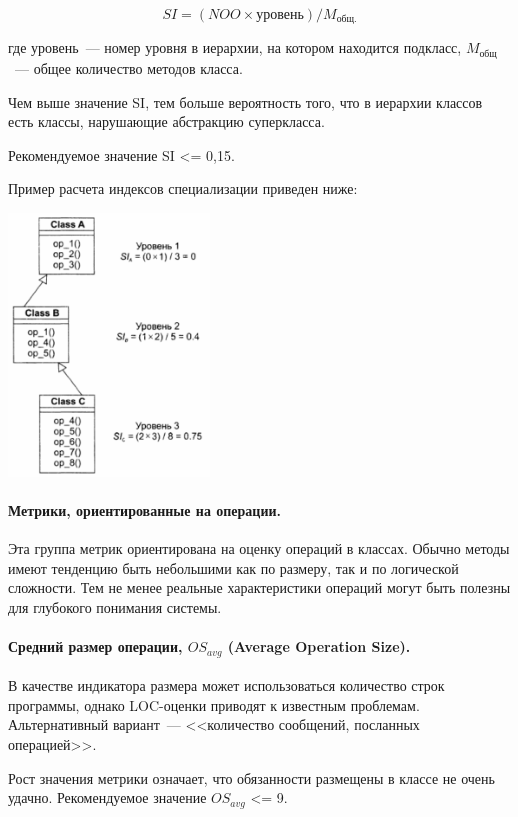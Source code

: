 \documentclass{../../text-style}
\begin{document}
$$SI = (NOO \times \text{уровень}) / M_\text{общ.}$$

где уровень~--- номер уровня в иерархии, на котором находится подкласс, $M_{\text{общ}}$~--- общее количество методов класса.

Чем выше значение SI, тем больше вероятность того, что в иерархии классов есть классы, нарушающие абстракцию суперкласса.

Рекомендуемое значение SI <= 0,15.

Пример расчета индексов специализации приведен ниже:

\begin{center}
    \includegraphics[width=0.4\textwidth]{siCalculation.png}
\end{center}

\paragraph{Метрики, ориентированные на операции.} Эта группа метрик ориентирована на оценку операций в классах. Обычно методы имеют тенденцию быть небольшими как по размеру, так и по логической сложности. Тем не менее реальные характеристики операций могут быть полезны для глубокого понимания системы.

\paragraph{Средний размер операции, $OS_{avg}$ (Average Operation Size).} В качестве индикатора размера может использоваться количество строк программы, однако LOC-оценки приводят к известным проблемам. Альтернативный вариант~--- <<количество сообщений, посланных операцией>>.

Рост значения метрики означает, что обязанности размещены в классе не очень удачно. Рекомендуемое значение $OS_{avg}$ <= 9.
\end{document}
